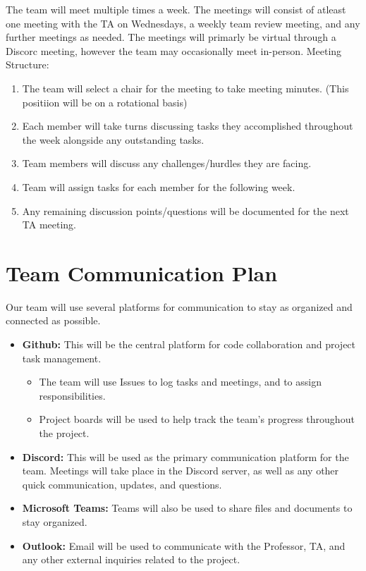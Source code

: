 \documentclass{article}
\begin{document}
The team will meet multiple times a week. The meetings will consist of atleast
one meeting with the TA on Wednesdays, a weekly team review meeting, and any 
further meetings as needed. The meetings will primarly be virtual through a Discorc
meeting, however the team may occasionally meet in-person.
Meeting Structure:
\begin{enumerate}
  \item The team will select a chair for the meeting to take meeting minutes. (This positiion will be on a rotational basis) 
  \item Each member will take turns discussing tasks they accomplished throughout the week alongside any outstanding tasks.
  \item Team members will discuss any challenges/hurdles they are facing.
  \item Team will assign tasks for each member for the following week.
  \item Any remaining discussion points/questions will be documented for the next TA meeting.
\end{enumerate}

\section{Team Communication Plan}

Our team will use several platforms for communication to stay as organized and connected as possible.
\begin{itemize}
	\item {\bf Github:} This will be the central platform for code collaboration and project task management. 
	\begin{itemize}
    \item The team will use Issues to log tasks and meetings, and to assign responsibilities.
    \item Project boards will be used to help track the team's progress throughout the project.
  \end{itemize}
  \item {\bf Discord:} This will be used as the primary communication platform for the team. 
        Meetings will take place in the Discord server, as well as any other quick communication, updates, and questions.
  \item {\bf Microsoft Teams:} Teams will also be used to share files and documents to stay organized.
  \item {\bf Outlook:} Email will be used to communicate with the Professor, TA, and any other external inquiries related to the project.
\end{itemize}
\end{document}
